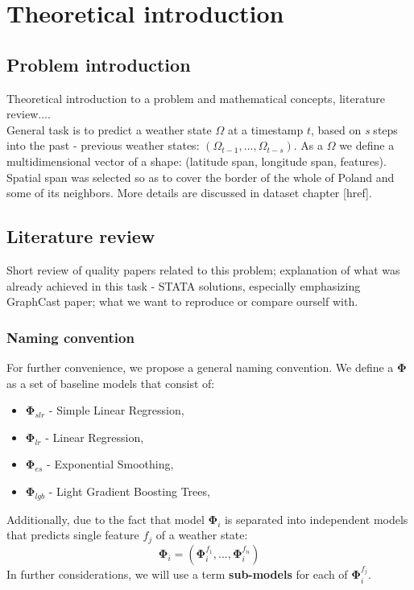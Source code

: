 \chapter{Theoretical introduction}
	
\section{Problem introduction}
 Theoretical introduction to a problem and mathematical concepts, literature review.... \\
 
 \noindent General task is to predict a weather state $\Omega$ at a timestamp $t$, based on \emph{s} steps into the past - previous weather states: $(\Omega_{t-1}, ..., \Omega_{t-s})$.
 As a $\Omega$ we define a multidimensional vector of a shape: (latitude span, longitude span, features). Spatial span was selected so as to cover the border of the whole of Poland and some of its neighbors. More details are discussed in dataset chapter [href].

\section{Literature review}
Short review of quality papers related to this problem; explanation of what was already achieved in this task - STATA solutions, especially emphasizing GraphCast paper; what we want to reproduce or compare ourself with.
 
 \subsection{Naming convention}
 For further convenience, we propose a general naming convention. We define a $\mathbf{\Phi}$ as a set of baseline models that consist of: 
 \begin{itemize}
    \item $\mathbf{\Phi}_{slr}$ - Simple Linear Regression,
    \item $\mathbf{\Phi}_{lr}$ - Linear Regression,
    \item $\mathbf{\Phi}_{es}$ - Exponential Smoothing,
    \item $\mathbf{\Phi}_{lgb}$ - Light Gradient Boosting Trees,
 \end{itemize}
 
 \noindent Additionally, due to the fact that model $\mathbf{\Phi}_i$ is separated into independent models that predicts single feature $f_j$ of a weather state: 
 \[
 \mathbf{\Phi}_{i} = (\mathbf{\Phi}_{i}^{f_1}, ..., \mathbf{\Phi}_{i}^{f_n})
 \]
 In further considerations, we will use a term \textbf{sub-models} for each of $\mathbf{\Phi}_{i}^{f_j}$.

